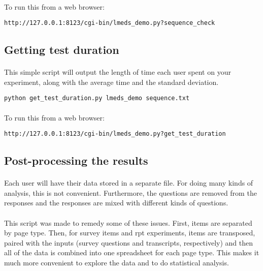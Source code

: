 \paragraph{}
To run this from a web browser:
\begin{lstlisting}
http://127.0.0.1:8123/cgi-bin/lmeds_demo.py?sequence_check
\end{lstlisting}


\subsection{Getting test duration}

\paragraph{}
This simple script will output the length of time each user spent on your experiment, along with the average time and the standard deviation.

\begin{lstlisting}
python get_test_duration.py lmeds_demo sequence.txt
\end{lstlisting}

\paragraph{}
To run this from a web browser:
\begin{lstlisting}
http://127.0.0.1:8123/cgi-bin/lmeds_demo.py?get_test_duration
\end{lstlisting}


\subsection{Post-processing the results}
\label{postprocessresults}

\paragraph{}
Each user will have their data stored in a separate file.  For doing many kinds of analysis, this is not convenient.  Furthermore, the questions are removed from the responses and the responses are mixed with different kinds of questions.

\paragraph{}
This script was made to remedy some of these issues.  First, items are separated by page type.  Then, for survey items and rpt experiments, items are transposed, paired with the inputs (survey questions and transcripts, respectively) and then all of the data is combined into one spreadsheet for each page type.  This makes it much more convenient to explore the data and to do statistical analysis.

